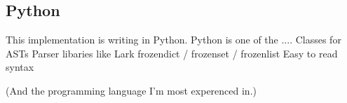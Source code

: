 \subsection{Python}

This implementation is writing in Python. Python is one of the ....
Classes for ASTs
Parser libaries like Lark
frozendict / frozenset / frozenlist
Easy to read syntax

(And the programming language I'm most experenced in.)

